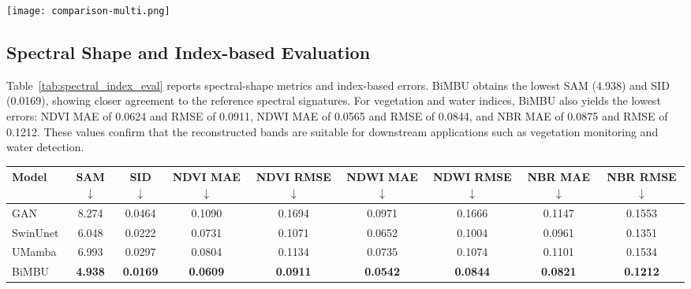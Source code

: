\begin{table}
\begin{tabular}{lcccc}
    \end{tabular}
\end{table}


\begin{figure*}
    \centering
    \texttt{[image: comparison-multi.png]}
    \caption{Example visualizations of model outputs. From left to right: target Sentinel-2 image, BiMBU, GAN, SwinUnet, and UMamba.}
    \label{fig:examples}
\end{figure*}

\subsection{Spectral Shape and Index-based Evaluation}

Table~\ref{tab:spectral_index_eval} reports spectral-shape metrics and index-based errors. BiMBU obtains the lowest SAM (4.938) and SID (0.0169), showing closer agreement to the reference spectral signatures. For vegetation and water indices, BiMBU also yields the lowest errors: NDVI MAE of 0.0624 and RMSE of 0.0911, NDWI MAE of 0.0565 and RMSE of 0.0844, and NBR MAE of 0.0875 and RMSE of 0.1212. These values confirm that the reconstructed bands are suitable for downstream applications such as vegetation monitoring and water detection.


\begin{table*}
\centering
\renewcommand{\arraystretch}{1.2}
\caption{Spectral shape consistency (SAM, SID) and index-based evaluation (MAE and RMSE for NDVI, NDWI, and NBR) across models. $\downarrow$ indicates lower is better.}
\label{tab:spectral_index_eval}
\begin{tabular}{lcccccccc}
\hline
\textbf{Model} & \textbf{SAM} $\downarrow$ & \textbf{SID} $\downarrow$ & \textbf{NDVI MAE} $\downarrow$ & \textbf{NDVI RMSE} $\downarrow$ & \textbf{NDWI MAE} $\downarrow$ & \textbf{NDWI RMSE} $\downarrow$ & \textbf{NBR MAE} $\downarrow$ & \textbf{NBR RMSE} $\downarrow$ \\
\hline
GAN  & 8.274 & 0.0464 & 0.1090 & 0.1694 & 0.0971 & 0.1666 & 0.1147 & 0.1553 \\

SwinUnet & 6.048 & 0.0222 & 0.0731 & 0.1071 & 0.0652 & 0.1004 & 0.0961 & 0.1351 \\

UMamba   & 6.993 & 0.0297 & 0.0804 & 0.1134 & 0.0735 & 0.1074 & 0.1101 & 0.1534 \\


BiMBU   & \textbf{4.938} & \textbf{0.0169} & \textbf{0.0609} & \textbf{0.0911} & \textbf{0.0542} & \textbf{0.0844} & \textbf{0.0821} & \textbf{0.1212} \\

\hline
\end{tabular}
\end{table*}


